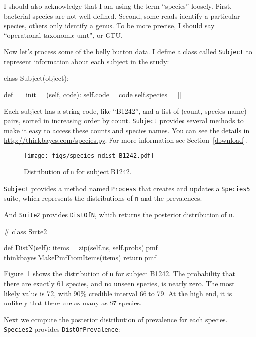 \documentclass[12pt]{book}
\theoremstyle{exercise}
\newcommand{\py}[1]{{\tt #1}}%
\begin{document}
I should also acknowledge that I am using the term ``species''
loosely.  First, bacterial species are not well defined.  Second,
some reads identify a particular species, others only identify
a genus.  To be more precise, I should say ``operational
taxonomic unit'', or OTU.

Now let's process some of the belly button data.  I define
a class called \py{Subject} to represent information about
each subject in the study:

\begin{code}
class Subject(object):

    def __init__(self, code):
        self.code = code
        self.species = []
\end{code}

Each subject has a string code, like ``B1242'', and a list of
(count, species name) pairs, sorted in increasing order by count.
\py{Subject} provides several methods to make it
easy to access these counts and species names.  You can see the details
in \url{http://thinkbayes.com/species.py}.
  For more information
see Section~\ref{download}.

\begin{figure}
\centerline{\texttt{[image: figs/species-ndist-B1242.pdf]}}
\caption{Distribution of \py{n} for subject B1242.}
\label{species-ndist}
\end{figure}

\py{Subject} provides a method named \py{Process} that creates and
updates a \py{Species5} suite,
which represents the distributions of \py{n} and the prevalences.

And \py{Suite2} provides \py{DistOfN}, which returns the posterior
distribution of \py{n}.

\begin{code}
# class Suite2

    def DistN(self):
        items = zip(self.ns, self.probs)
        pmf = thinkbayes.MakePmfFromItems(items)
        return pmf
\end{code}

Figure~\ref{species-ndist} shows the distribution of \py{n} for
subject B1242.  The probability that there are exactly 61 species, and
no unseen species, is nearly zero.  The most likely value is 72, with
90\% credible interval 66 to 79.  At the high end, it is unlikely that
there are as many as 87 species.

Next we compute the posterior distribution of prevalence for
each species.  \py{Species2} provides \py{DistOfPrevalence}:
\end{document}
